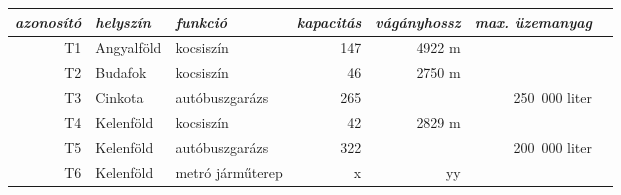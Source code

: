 \sf
\centering
\begin{tabular}{rllrrrr}
	\toprule
	\it azonosító & \it helyszín & \it funkció    & \it kapacitás & \it vágányhossz & \it max. üzemanyag &  \\ \midrule
	           T1 & Angyalföld   & kocsiszín      &           147 &          4922 m &                    &  \\
	           T2 & Budafok      & kocsiszín      &            46 &          2750 m &                    &  \\
	           T3 & Cinkota      & autóbuszgarázs &           265 &                 &      250~000 liter &  \\
	           T4 & Kelenföld    & kocsiszín      &            42 &          2829 m &                    &  \\
	           T5 & Kelenföld    & autóbuszgarázs &           322 &                 &      200~000 liter &  \\
	           T6 & Kelenföld    & metró járműterep &           x & yy                &       & \\
	           \bottomrule
\end{tabular}

